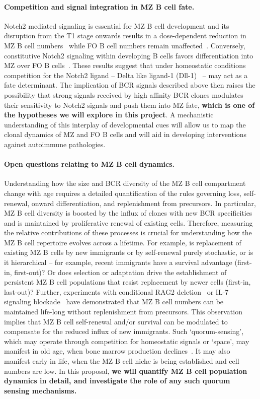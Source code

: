 \documentclass[11pt]{article}
\newcommand{\para}[1]{\vspace*{-4.5mm}\paragraph{#1}}
\begin{document}
\para{Competition and signal integration in MZ B cell fate.}
Notch2 mediated signaling is essential for MZ B cell development and its disruption from the T1 stage onwards results in a dose-dependent reduction in MZ B cell numbers~\cite{Tanigaki_2002, Saito_2003, Witt_2003, Hozumi_2004, Tan_2009}  while  FO B cell numbers remain unaffected~\cite{Tanigaki_2002}. 
Conversely, constitutive Notch2 signaling within developing B cells favors differentiation into MZ over FO B cells~\cite{Hampel_2011, Lechner_2021}.
These results suggest that under homeostatic conditions competition for the Notch2 ligand -- Delta like ligand-1 (Dll-1)~\cite{Hozumi_2004, Fasnacht_2014} -- may act as a fate determinant. 
The implication of BCR signals described above then raises the possibility that strong signals received by high affinity BCR clones modulates their sensitivity to Notch2 signals and push them into MZ fate, \textbf{which is one of the hypotheses we will explore in this project}.
A mechanistic understanding of this interplay of developmental cues will allow us to map the clonal dynamics of MZ and FO B cells and will aid in developing interventions against autoimmune pathologies.


\para{Open questions relating to MZ B cell dynamics.}
Understanding how the size and BCR diversity of the MZ B cell compartment change with age requires a detailed quantification of the rules governing loss, self-renewal, onward differentiation, and replenishment from precursors. 
In particular, MZ B cell diversity is boosted by the influx of clones with new BCR specificities and is maintained by proliferative renewal of existing cells.
Therefore, measuring the relative contributions of these processes is crucial for understanding how the MZ B cell repertoire evolves across a lifetime. 
For example, is replacement of existing MZ B cells by new immigrants or by self-renewal purely stochastic, or is it hierarchical -- for example, recent immigrants have a survival advantage (first-in, first-out)?
Or does selection or adaptation drive the establishment of persistent MZ B cell populations that resist replacement by newer cells (first-in, last-out)?
Further, experiments with conditional RAG2 deletion~\cite{Hao_2001} or IL-7 signaling blockade~\cite{Carvalho_2001} have demonstrated that MZ B cell numbers can be maintained life-long without replenishment from precursors.
This observation implies that MZ B cell self-renewal and/or survival can be modulated to compensate for the reduced influx of new immigrants.
Such `quorum-sensing', which may operate through competition for homeostatic signals or `space', may manifest in old age, when bone marrow production declines~\cite{Kline_1999, Keren_2011, Scholz_2013}.
It may also manifest early in life, when the MZ B cell niche is being established and cell numbers are low.
In this proposal, \textbf{we will quantify MZ B cell population dynamics in detail, and investigate the role of any such quorum sensing mechanisms.}
\end{document}
